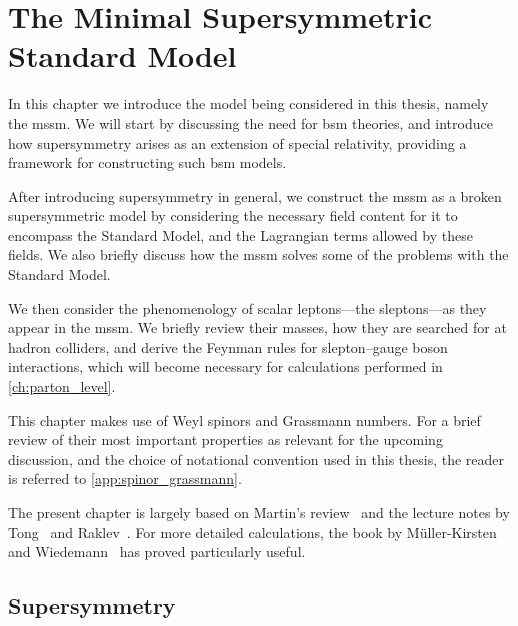 \chapter[The Minimal Supersymmetric Standard Model]{The Minimal Supersymmetric\\Standard Model}\label{ch:mssm}

In this chapter we introduce the model being considered in this thesis, namely the \acrfull{mssm}.
We will start by discussing the need for \gls{bsm} theories, and introduce how supersymmetry arises as an extension of special relativity, providing a framework for constructing such \gls{bsm} models.

After introducing supersymmetry in general, we construct the \gls{mssm} as a broken supersymmetric model by considering the necessary field content for it to encompass the Standard Model, and the Lagrangian terms allowed by these fields.
We also briefly discuss how the \gls{mssm} solves some of the problems with the Standard Model.

We then consider the phenomenology of scalar leptons---the sleptons---as they appear in the \gls{mssm}. We briefly review their masses, how they are searched for at hadron colliders, and derive the Feynman rules for slepton--gauge boson interactions, which will become necessary for calculations performed in \cref{ch:parton_level}.

This chapter makes use of Weyl spinors and Grassmann numbers. For a brief review of their most important properties as relevant for the upcoming discussion, and the choice of notational convention used in this thesis, the reader is referred to \cref{app:spinor_grassmann}.

The present chapter is largely based on Martin's review~\cite{Martin:1997ns} and the lecture notes by Tong~\cite{Tong:susy} and Raklev~\cite{Raklev:susy}.
For more detailed calculations, the book by M\"uller-Kirsten and Wiedemann~\cite{IntrSUSY2010} has proved particularly useful.


\section{Supersymmetry}

\glsresetall

